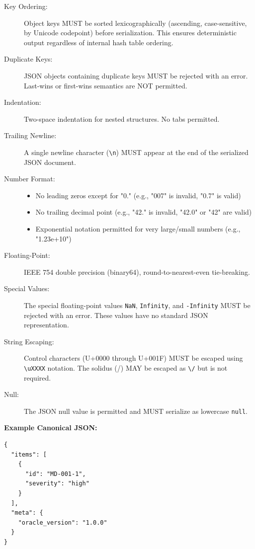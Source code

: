 \documentclass[11pt,a4paper]{article}
\begin{document}
\begin{description}
\item[Key Ordering:] Object keys MUST be sorted lexicographically (ascending, case-sensitive, by Unicode codepoint) before serialization. This ensures deterministic output regardless of internal hash table ordering.

\item[Duplicate Keys:] JSON objects containing duplicate keys MUST be rejected with an error. Last-wins or first-wins semantics are NOT permitted.

\item[Indentation:] Two-space indentation for nested structures. No tabs permitted.

\item[Trailing Newline:] A single newline character (\texttt{\textbackslash n}) MUST appear at the end of the serialized JSON document.

\item[Number Format:] 
\begin{itemize}
\item No leading zeros except for "0." (e.g., "007" is invalid, "0.7" is valid)
\item No trailing decimal point (e.g., "42." is invalid, "42.0" or "42" are valid)
\item Exponential notation permitted for very large/small numbers (e.g., "1.23e+10")
\end{itemize}

\item[Floating-Point:] IEEE 754 double precision (binary64), round-to-nearest-even tie-breaking.

\item[Special Values:] The special floating-point values \texttt{NaN}, \texttt{Infinity}, and \texttt{-Infinity} MUST be rejected with an error. These values have no standard JSON representation.

\item[String Escaping:] Control characters (U+0000 through U+001F) MUST be escaped using \texttt{\textbackslash uXXXX} notation. The solidus (/) MAY be escaped as \texttt{\textbackslash /} but is not required.

\item[Null:] The JSON null value is permitted and MUST serialize as lowercase \texttt{null}.
\end{description}

\textbf{Example Canonical JSON:}
\begin{verbatim}
{
  "items": [
    {
      "id": "MD-001-1",
      "severity": "high"
    }
  ],
  "meta": {
    "oracle_version": "1.0.0"
  }
}
\end{verbatim}
\end{document}
